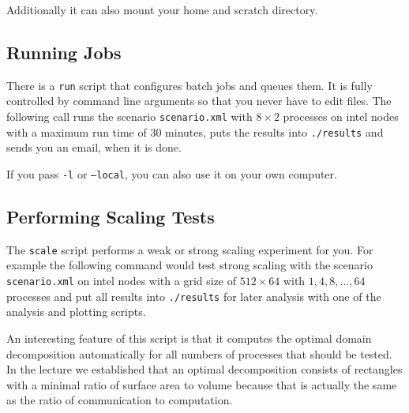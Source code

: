 Additionally it can also mount your home and scratch directory.

\subsection{Running Jobs}

There is a \texttt{run} script that configures batch jobs and queues them. It is
fully controlled by command line arguments so that you never have to edit
files. The following call runs the scenario \texttt{scenario.xml} with
$8 \times 2$ processes on intel nodes with a maximum run time of 30 minutes,
puts the results into \texttt{./results} and sends you an email, when it is
done.


If you pass \texttt{-l} or \texttt{--local}, you can also use it on your own computer.

\subsection{Performing Scaling Tests}

The \texttt{scale} script performs a weak or strong scaling experiment for
you. For example the following command would test strong scaling with the
scenario \texttt{scenario.xml} on intel nodes with a grid size of
$512 \times 64$ with $1, 4, 8, \dots, 64$ processes and put all results into
\texttt{./results} for later analysis with one of the analysis and plotting
scripts.


An interesting feature of this script is that it computes the optimal domain
decomposition automatically for all numbers of processes that should be
tested. In the lecture we established that an optimal decomposition consists of
rectangles with a minimal ratio of surface area to volume because that is
actually the same as the ratio of communication to computation.

